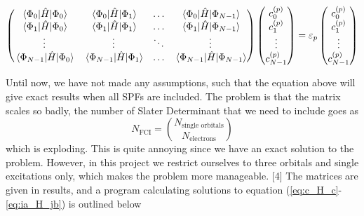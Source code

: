\begin{equation}
\begin{pmatrix}
\mel{\Phi_0}{\hat{H}}{\Phi_0} & \mel{\Phi_0}{\hat{H}}{\Phi_1} & \hdots & \mel{\Phi_0}{\hat{H}}{\Phi_{N-1}}\\
\mel{\Phi_1}{\hat{H}}{\Phi_0} & \mel{\Phi_1}{\hat{H}}{\Phi_1} & \hdots & \mel{\Phi_1}{\hat{H}}{\Phi_{N-1}}\\
\vdots & \vdots & \ddots & \vdots\\
\mel{\Phi_{N-1}}{\hat{H}}{\Phi_0} & \mel{\Phi_{N-1}}{\hat{H}}{\Phi_1} & \hdots & \mel{\Phi_{N-1}}{\hat{H}}{\Phi_{N-1}}\\
\end{pmatrix}
\begin{pmatrix}
c_0^{(p)}\\ c_1^{(p)} \\ \vdots\\ c_{N-1}^{(p)}
\end{pmatrix}
=\varepsilon_p
\begin{pmatrix}
c_0^{(p)}\\ c_1^{(p)} \\ \vdots\\ c_{N-1}^{(p)}
\end{pmatrix}
\label{eq:CIS_matrix}
\end{equation}

Until now, we have not made any assumptions, such that the equation above will give exact results when all SPFs are included. The problem is that the matrix scales so badly, the number of Slater Determinant that we need to include goes as 
\begin{equation}
N_{\text{FCI}}=\binom{N_{\text{single orbitals}}}{N_{\text{electrons}}}
\end{equation}
which is exploding. This is quite annoying since we have an exact solution to the problem. However, in this project we restrict ourselves to three orbitals and single excitations only, which makes the problem more manageable. [4] The matrices are given in results, and a program calculating solutions to equation (\ref{eq:c_H_c}-\ref{eq:ia_H_jb}) is outlined below

